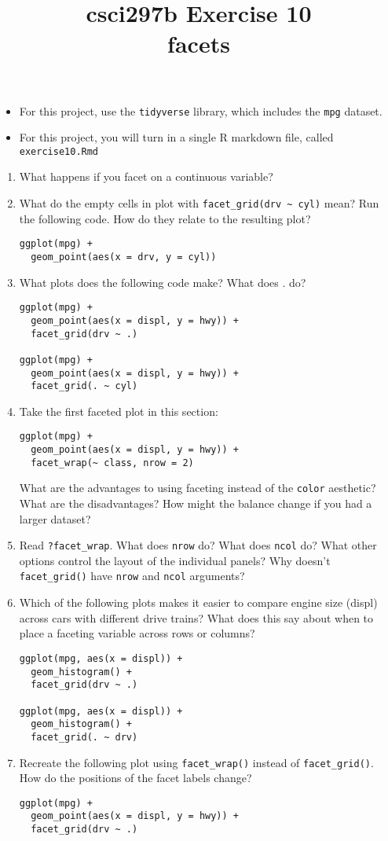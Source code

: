 \documentclass[12pt]{article}
\title{csci297b Exercise 10\\facets
  }
\date{}
\newcommand{\bi}{\begin{itemize}}
\newcommand{\ei}{\end{itemize}}
\newcommand{\li}{\item}
\begin{document}
\maketitle

\bi
\li
For this project, use the {\tt tidyverse} library, which includes the {\tt mpg} dataset.
\li
For this project, you will turn in a single R markdown file, called \verb|exercise10.Rmd|

\ei
\begin{enumerate}
\item
What happens if you facet on a continuous variable?
\item
What do the empty cells in plot with \verb|facet_grid(drv ~ cyl)| mean? Run the following code. How do they relate to the resulting plot?
\begin{verbatim}
ggplot(mpg) + 
  geom_point(aes(x = drv, y = cyl))
\end{verbatim}
\item
What plots does the following code make? What does . do?
\begin{verbatim}
ggplot(mpg) + 
  geom_point(aes(x = displ, y = hwy)) +
  facet_grid(drv ~ .)

ggplot(mpg) + 
  geom_point(aes(x = displ, y = hwy)) +
  facet_grid(. ~ cyl)
\end{verbatim}
\item
Take the first faceted plot in this section:
\begin{verbatim}
ggplot(mpg) + 
  geom_point(aes(x = displ, y = hwy)) + 
  facet_wrap(~ class, nrow = 2)
\end{verbatim}
What are the advantages to using faceting instead of the \verb|color| aesthetic? What are the disadvantages? How might the balance change if you had a larger dataset?
\item
Read \verb|?facet_wrap|. What does \verb|nrow| do? What does \verb|ncol| do? What other options control the layout of the individual panels? Why doesn’t \verb|facet_grid()| have \verb|nrow| and \verb|ncol| arguments?

\item
Which of the following plots makes it easier to compare engine size (displ) across cars with different drive trains? What does this say about when to place a faceting variable across rows or columns?
\begin{verbatim}
ggplot(mpg, aes(x = displ)) + 
  geom_histogram() + 
  facet_grid(drv ~ .)

ggplot(mpg, aes(x = displ)) + 
  geom_histogram() +
  facet_grid(. ~ drv)
\end{verbatim}
\item 
Recreate the following plot using \verb|facet_wrap()| instead of \verb|facet_grid()|. How do the positions of the facet labels change?
\begin{verbatim}
ggplot(mpg) + 
  geom_point(aes(x = displ, y = hwy)) +
  facet_grid(drv ~ .)
\end{verbatim}
\end{enumerate}
\end{document}
